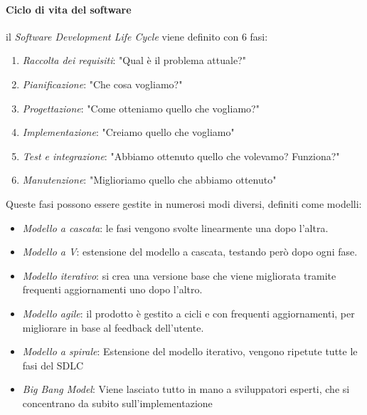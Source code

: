 \documentclass{article}
\begin{document}
        \paragraph{Ciclo di vita del software} il \textit{Software Development Life Cycle} viene definito con 6 fasi:
            \begin{enumerate}
                \item \textit{Raccolta dei requisiti}: "Qual è il problema attuale?"
                \item \textit{Pianificazione}: "Che cosa vogliamo?"
                \item \textit{Progettazione}: "Come otteniamo quello che vogliamo?"
                \item \textit{Implementazione}: "Creiamo quello che vogliamo"
                \item \textit{Test e integrazione}: "Abbiamo ottenuto quello che volevamo? Funziona?"
                \item \textit{Manutenzione}: "Miglioriamo quello che abbiamo ottenuto"
            \end{enumerate}
            Queste fasi possono essere gestite in numerosi modi diversi, definiti come modelli:
            \begin{itemize}
                \item \textit{Modello a cascata}: le fasi vengono svolte linearmente una dopo l'altra.
                \item \textit{Modello a V}: estensione del modello a cascata, testando però dopo ogni fase.
                \item \textit{Modello iterativo}: si crea una versione base che viene migliorata tramite frequenti aggiornamenti uno dopo l'altro.
                \item \textit{Modello agile}: il prodotto è gestito a cicli e con frequenti aggiornamenti, per  migliorare in base al feedback dell'utente.
                \item \textit{Modello a spirale}: Estensione del modello iterativo, vengono ripetute tutte le fasi del SDLC
                \item \textit{Big Bang Model}: Viene lasciato tutto in mano a sviluppatori esperti, che si concentrano da subito sull'implementazione
            \end{itemize}
\end{document}
